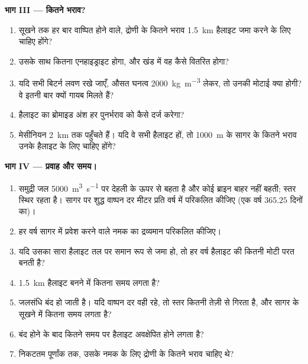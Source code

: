 \begin{problem}
\noindent\textbf{भाग III --- कितने भराव?}
\begin{enumerate}[resume]
  \item सूखने तक हर बार वाष्पित होने वाले, द्रोणी के कितने भराव \qty{1.5}{km} हैलाइट जमा करने के लिए चाहिए होंगे?
  \item उसके साथ कितना एनहाइड्राइट होगा, और खंड में वह कैसे वितरित होगा?
  \item यदि सभी बिटर्न लवण रखे जाएँ, औसत घनत्व \qty{2000}{kg.m^{-3}} लेकर, तो उनकी मोटाई क्या होगी? वे इतनी बार क्यों गायब मिलते हैं?
  \item हैलाइट का ब्रोमाइड अंश हर पुनर्भराव को कैसे दर्ज करेगा?
  \item मेसीनियन  \qty{2}{km} तक पहुँचते हैं। यदि वे सभी हैलाइट हों, तो \qty{1000}{m} के सागर के कितने भराव उनके हैलाइट के लिए चाहिए होंगे?
\end{enumerate}

\noindent\textbf{भाग IV --- प्रवाह और समय।}
\begin{enumerate}[resume]
  \item समुद्री जल \qty{5000}{m^3.s^{-1}} पर देहली के ऊपर से बहता है और कोई ब्राइन बाहर नहीं बहती; स्तर स्थिर रहता है। सागर पर शुद्ध वाष्पन दर मीटर प्रति वर्ष में परिकलित कीजिए (एक वर्ष $365.25$ दिनों का)।
  \item हर वर्ष सागर में प्रवेश करने वाले नमक का द्रव्यमान परिकलित कीजिए।
  \item यदि उसका सारा हैलाइट तल पर समान रूप से जमा हो, तो हर वर्ष हैलाइट की कितनी मोटी परत बनती है?
  \item \qty{1.5}{km} हैलाइट बनने में कितना समय लगता है?
  \item जलसंधि बंद हो जाती है। यदि वाष्पन दर वही रहे, तो स्तर कितनी तेज़ी से गिरता है, और सागर के सूखने में कितना समय लगता है?
  \item बंद होने के बाद कितने समय पर हैलाइट अवक्षेपित होने लगता है?
  \item निकटतम पूर्णांक तक, उसके नमक के लिए द्रोणी के कितने भराव चाहिए थे?
\end{enumerate}
\end{problem}
